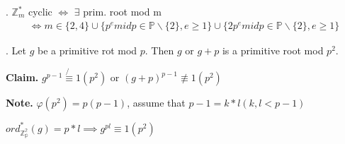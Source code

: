 
\Theorem.
$\mathbb{Z}_m^{*}$ cyclic $\Leftrightarrow$ $\exists$ prim. root mod m 
\begin{align*}
  \Leftrightarrow 
    m \in \{2,4\} \cup \{ p^e mid p \in \mathbb{P} \backslash \{2\}, e \geq 1 \} \cup \{ 2p^e mid p \in \mathbb{P} \backslash \{2\}, e \geq 1 \}
\end{align*}

\Proof.
Let $g$ be a primitive rot mod $p$. Then $g$ or $g+p$ is a primitive root mod $p^2$.


\textbf{Claim.}
$g^{p-1} \not{\equiv} 1 (p^2)$ or $(g+p)^{p-1} \not\equiv 1 (p^2)$

\textbf{Note.}
$\varphi(p^2) = p(p-1)$, assume that $p-1 = k*l (k, l < p-1)$

$ord_{\mathbb{Z_p^2}}^{*}(g) = p*l \implies g^{pl} \equiv 1 (p^2)$



